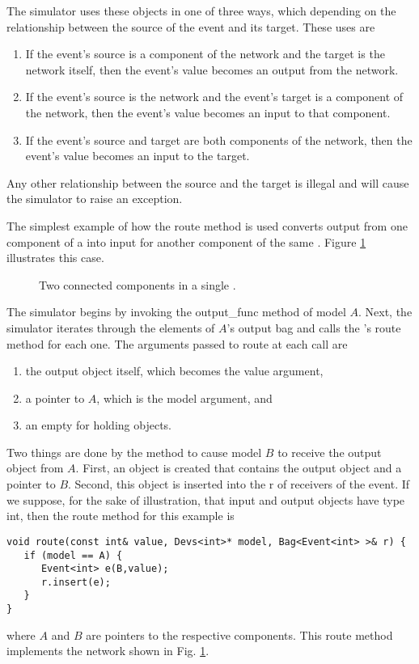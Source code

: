 The simulator uses these  objects in one of three ways, which depending on the relationship between the source of the event and its target. These uses are
\begin{enumerate}
\item If the event's source is a component of the network and the target is the network itself, then the event's value becomes an output from the network.
\item If the event's source is the network and the event's target is a component of the network, then the event's value becomes an input to that component.
\item If the event's source and target are both components of the network, then the event's value becomes an input to the target.
\end{enumerate}
Any other relationship between the source and the target is illegal and will cause the simulator to raise an exception.

The simplest example of how the route method is used converts output from one  component of a  into input for another  component of the same . Figure \ref{fig:atomic_to_atomic_coupling} illustrates this case. 
\begin{figure}[ht]
\centering
{}
\caption{Two connected  components in a single .}
\label{fig:atomic_to_atomic_coupling}
\end{figure} 

The simulator begins by invoking the output\_func method of  model $A$. Next, the simulator iterates through the elements of $A$'s output bag and calls the 's route method for each one. The arguments passed to route at each call are
\begin{enumerate}
\item the output object itself, which becomes the value argument,
\item a pointer to $A$, which is the model argument, and
\item an empty  for holding  objects.
\end{enumerate} 
Two things are done by the  method to cause  model $B$ to receive the output object from $A$. First, an  object is created that contains the output object and a pointer to $B$. Second, this  object is inserted into the  r of receivers of the event. If we suppose, for the sake of illustration, that input and output objects have type int, then the route method for this example is
\begin{verbatim}
void route(const int& value, Devs<int>* model, Bag<Event<int> >& r) {
   if (model == A) {
      Event<int> e(B,value);
      r.insert(e);
   }
}
\end{verbatim}
where $A$ and $B$ are pointers to the respective components. This route method implements the network shown in Fig. \ref{fig:atomic_to_atomic_coupling}.

